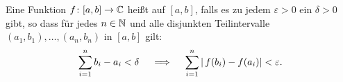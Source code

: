 Eine Funktion $f\colon[a,b]\to \mathbb{C}$ heißt  auf $[a,b]$, falls es zu jedem $\varepsilon>0$ ein $\delta>0$ gibt, so dass für jedes $n\in\mathbb{N}$ und alle disjunkten Teilintervalle $(a_1,b_1),\dots,(a_n,b_n)$ in $[a,b]$ gilt: 
\begin{equation*}
    \sum_{i=1}^n b_i - a_i <\delta \quad \implies \quad \sum_{i=1}^n \left| \,f(b_i) - f(a_i)\right|<\varepsilon.
\end{equation*}